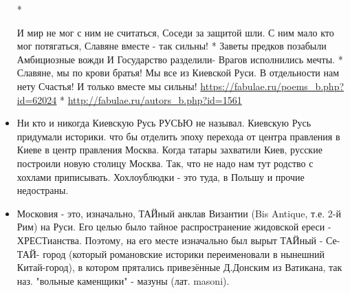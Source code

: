 \begin{itemize}
*

И мир не мог с ним не считаться,
Соседи за защитой шли.
С ним мало кто мог потягаться,
Славяне вместе - так сильны!
*
Заветы предков позабыли
Амбициозные вожди
И Государство разделили-
Врагов исполнились мечты.
*
Славяне, мы по крови братья!
Мы все из Киевской Руси.
В отдельности нам нету Счастья!
И только вместе мы сильны!
\url{https://fabulae.ru/poems_b.php?id=62024}
*
\url{http://fabulae.ru/autors_b.php?id=1561}

\item {}

Ни кто и никогда Киевскую Русь РУСЬЮ не называл. Киевскую Русь придумали
историки. что бы отделить эпоху перехода от центра правления в Киеве в центр
правления Москва. Когда татары захватили Киев, русские построили новую столицу
Москва. Так, что не надо нам тут родство с хохлами приписывать. Хохлоублюдки -
это туда, в Польшу и прочие недостраны.

\item {}

Московия - это, изначально, ТАЙный анклав Византии (Bis Antique, т.е. 2-й Рим)
на Руси. Его целью было тайное распространение жидовской ереси - ХРЕСТианства.
Поэтому, на его месте изначально был вырыт ТАЙный - Се-ТАЙ- город (который
романовские историки переименовали в нынешний Китай-город), в котором прятались
привезённые Д.Донским из Ватикана, так наз. "вольные каменщики" - мазуны (лат.
masoni).

\end{itemize}

